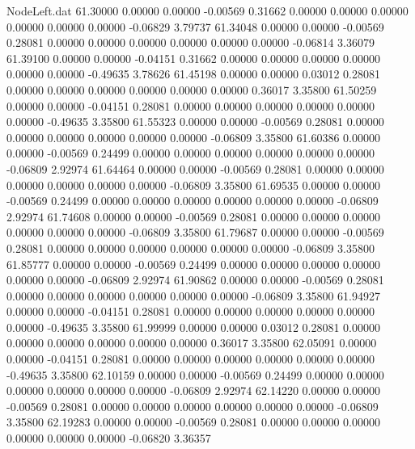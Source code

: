 \begin{filecontents}{NodeLeft.dat}
  61.30000    0.00000    0.00000    -0.00569    0.31662    0.00000    0.00000    0.00000    0.00000    0.00000    0.00000   -0.06829    3.79737
  61.34048    0.00000    0.00000    -0.00569    0.28081    0.00000    0.00000    0.00000    0.00000    0.00000    0.00000   -0.06814    3.36079
  61.39100    0.00000    0.00000    -0.04151    0.31662    0.00000    0.00000    0.00000    0.00000    0.00000    0.00000   -0.49635    3.78626
  61.45198    0.00000    0.00000     0.03012    0.28081    0.00000    0.00000    0.00000    0.00000    0.00000    0.00000    0.36017    3.35800
  61.50259    0.00000    0.00000    -0.04151    0.28081    0.00000    0.00000    0.00000    0.00000    0.00000    0.00000   -0.49635    3.35800
  61.55323    0.00000    0.00000    -0.00569    0.28081    0.00000    0.00000    0.00000    0.00000    0.00000    0.00000   -0.06809    3.35800
  61.60386    0.00000    0.00000    -0.00569    0.24499    0.00000    0.00000    0.00000    0.00000    0.00000    0.00000   -0.06809    2.92974
  61.64464    0.00000    0.00000    -0.00569    0.28081    0.00000    0.00000    0.00000    0.00000    0.00000    0.00000   -0.06809    3.35800
  61.69535    0.00000    0.00000    -0.00569    0.24499    0.00000    0.00000    0.00000    0.00000    0.00000    0.00000   -0.06809    2.92974
  61.74608    0.00000    0.00000    -0.00569    0.28081    0.00000    0.00000    0.00000    0.00000    0.00000    0.00000   -0.06809    3.35800
  61.79687    0.00000    0.00000    -0.00569    0.28081    0.00000    0.00000    0.00000    0.00000    0.00000    0.00000   -0.06809    3.35800
  61.85777    0.00000    0.00000    -0.00569    0.24499    0.00000    0.00000    0.00000    0.00000    0.00000    0.00000   -0.06809    2.92974
  61.90862    0.00000    0.00000    -0.00569    0.28081    0.00000    0.00000    0.00000    0.00000    0.00000    0.00000   -0.06809    3.35800
  61.94927    0.00000    0.00000    -0.04151    0.28081    0.00000    0.00000    0.00000    0.00000    0.00000    0.00000   -0.49635    3.35800
  61.99999    0.00000    0.00000     0.03012    0.28081    0.00000    0.00000    0.00000    0.00000    0.00000    0.00000    0.36017    3.35800
  62.05091    0.00000    0.00000    -0.04151    0.28081    0.00000    0.00000    0.00000    0.00000    0.00000    0.00000   -0.49635    3.35800
  62.10159    0.00000    0.00000    -0.00569    0.24499    0.00000    0.00000    0.00000    0.00000    0.00000    0.00000   -0.06809    2.92974
  62.14220    0.00000    0.00000    -0.00569    0.28081    0.00000    0.00000    0.00000    0.00000    0.00000    0.00000   -0.06809    3.35800
  62.19283    0.00000    0.00000    -0.00569    0.28081    0.00000    0.00000    0.00000    0.00000    0.00000    0.00000   -0.06820    3.36357

\end{filecontents}
